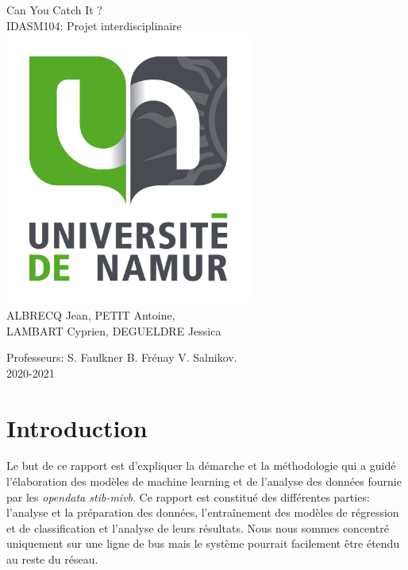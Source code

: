 \documentclass[12pt]{report}
\begin{document}
\begin{titlepage}
    \begin{sffamily}
    \begin{center}
    \Huge Can You Catch It ?
    \normalsize \\ IDASM104: Projet interdisciplinaire \\[0.5cm]

    \includegraphics[height=9cm]{images/unamur.png}
    \\[2cm]

    
    ALBRECQ Jean, PETIT Antoine, \\ LAMBART Cyprien, DEGUELDRE Jessica
    \\[0.5cm]

    \vfill

    {\large Professeurs: S. Faulkner B. Frénay V. Salnikov. \\ 2020-2021}
    
    \end{center}
    \end{sffamily}
\end{titlepage}
\newpage

\tableofcontents
\newpage

\chapter{Introduction}
Le but de ce rapport est d'expliquer la démarche et la méthodologie qui a guidé l'élaboration des modèles de machine learning et de l'analyse des données fournie par les \textit{opendata stib-mivb}. Ce rapport est constitué des différentes parties: l'analyse et la préparation des données, l'entraînement des modèles de régression et de classification et l'analyse de leurs résultats. Nous nous sommes concentré uniquement sur une ligne de bus mais le système pourrait facilement être étendu au reste du réseau.
\end{document}

